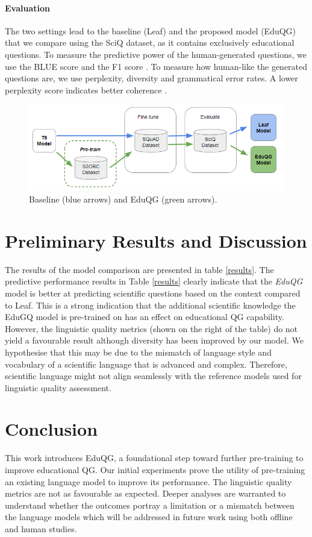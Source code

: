 \documentclass[letterpaper]{article} %
\begin{document}
\paragraph{Evaluation}
The two settings lead to the baseline (Leaf) and the proposed model (EduQG) that we compare using the SciQ dataset, as it contains exclusively educational questions.
To measure the predictive power of the human-generated questions, we use the BLUE score and the F1 score \cite{DBLP:rajpurkar2016squad}. To measure how human-like the generated questions are, we use perplexity, diversity and grammatical error rates. A lower perplexity score indicates better coherence \cite{wang2022towards}.
\begin{figure}[]
    \centering
    \includegraphics[width=\columnwidth]{methodology_new_v2.png}
    \caption{Baseline (blue arrows) and EduQG (green arrows).}
    \label{fig:method}
\end{figure}

\section{Preliminary Results and Discussion}

The results of the model comparison are presented in table \ref{results}.
The predictive performance results in Table \ref{results} clearly indicate that the \textit{EduQG} model is better at predicting scientific questions based on the context compared to Leaf. This is a strong indication that the additional scientific knowledge the EduGQ model is pre-trained on has an effect on educational QG capability. However, the linguistic quality metrics (shown on the right of the table) do not yield a favourable result although diversity has been improved by our model. We hypothesise that this may be due to the mismatch of language style and vocabulary of a scientific language that is advanced and complex. Therefore, scientific language might not align seamlessly with the reference models used for linguistic quality assessment.

\section{Conclusion}
This work introduces EduQG, a foundational step toward further pre-training to improve educational QG. Our initial experiments prove the utility of pre-training an existing language model to improve its performance. The linguistic quality metrics are not as favourable as expected. Deeper analyses are warranted to understand whether the outcomes portray a limitation or a mismatch between the language models which will be addressed in future work using both offline and human studies.
\end{document}
